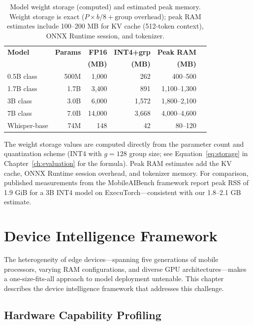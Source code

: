 \documentclass[12pt, letterpaper, twoside]{report}
\begin{document}
\begin{table}[H]
\centering
\caption{Model weight storage (computed) and estimated peak memory. Weight storage is exact ($P \times b/8 + \text{group overhead}$); peak RAM estimates include 100--200 MB for KV cache (512-token context), ONNX Runtime session, and tokenizer.}
\label{tab:size_memory}
{\small
\begin{tabular}{@{}lrrrrr@{}}
\toprule
\textbf{Model} & \textbf{Params} & \textbf{FP16} & \textbf{INT4+grp} & \textbf{Peak RAM} \\
 & & \textbf{(MB)} & \textbf{(MB)} & \textbf{(MB)} \\
\midrule
0.5B class & 500M  & 1{,}000 & 262  & 400--500 \\
1.7B class & 1.7B  & 3{,}400 & 891  & 1{,}100--1{,}300 \\
3B class   & 3.0B  & 6{,}000 & 1{,}572 & 1{,}800--2{,}100 \\
7B class   & 7.0B  & 14{,}000 & 3{,}668 & 4{,}000--4{,}600 \\
Whisper-base & 74M  & 148   & 42   & 80--120 \\
\bottomrule
\end{tabular}
}
\end{table}

The weight storage values are computed directly from the parameter count and quantization scheme (INT4 with $g = 128$ group size; see Equation~\ref{eq:storage} in Chapter~\ref{ch:evaluation} for the formula). Peak RAM estimates add the KV cache, ONNX Runtime session overhead, and tokenizer memory. For comparison, published measurements from the MobileAIBench framework report peak RSS of 1.9 GiB for a 3B INT4 model on ExecuTorch---consistent with our 1.8--2.1 GB estimate.

\chapter{Device Intelligence Framework}
\label{ch:device_intelligence}

The heterogeneity of edge devices---spanning five generations of mobile processors, varying RAM configurations, and diverse GPU architectures---makes a one-size-fits-all approach to model deployment untenable. This chapter describes the device intelligence framework that addresses this challenge.

\section{Hardware Capability Profiling}
\label{sec:hw_profiling}
\end{document}
